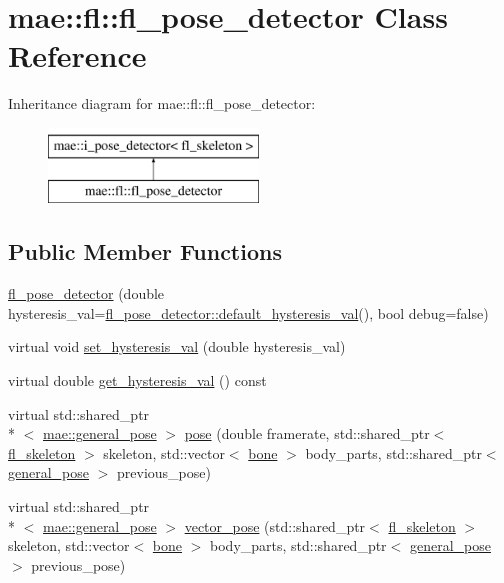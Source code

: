 \hypertarget{classmae_1_1fl_1_1fl__pose__detector}{\section{mae\-:\-:fl\-:\-:fl\-\_\-pose\-\_\-detector Class Reference}
\label{classmae_1_1fl_1_1fl__pose__detector}
}
Inheritance diagram for mae\-:\-:fl\-:\-:fl\-\_\-pose\-\_\-detector\-:\begin{figure}[H]
\begin{center}
\leavevmode
\includegraphics[height=2.000000cm]{classmae_1_1fl_1_1fl__pose__detector}
\end{center}
\end{figure}
\subsection*{Public Member Functions}
\begin{DoxyCompactItemize}
\item 
\hyperlink{classmae_1_1fl_1_1fl__pose__detector_a3e52ce649f55340ebcd5a2fec804278b}{fl\-\_\-pose\-\_\-detector} (double hysteresis\-\_\-val=\hyperlink{classmae_1_1fl_1_1fl__pose__detector_adb2f046d501a87de9e5589b346ef3782}{fl\-\_\-pose\-\_\-detector\-::default\-\_\-hysteresis\-\_\-val}(), bool debug=false)
\item 
virtual void \hyperlink{classmae_1_1fl_1_1fl__pose__detector_a807c41e01fed7a729058b91ff4ff90f3}{set\-\_\-hysteresis\-\_\-val} (double hysteresis\-\_\-val)
\item 
virtual double \hyperlink{classmae_1_1fl_1_1fl__pose__detector_a5347e97f3685d7168a182e7e373f09cf}{get\-\_\-hysteresis\-\_\-val} () const 
\item 
virtual std\-::shared\-\_\-ptr\\*
$<$ \hyperlink{classmae_1_1general__pose}{mae\-::general\-\_\-pose} $>$ \hyperlink{classmae_1_1fl_1_1fl__pose__detector_a3a0f6afa25ce9bc25154e93e671edd23}{pose} (double framerate, std\-::shared\-\_\-ptr$<$ \hyperlink{classmae_1_1fl_1_1fl__skeleton}{fl\-\_\-skeleton} $>$ skeleton, std\-::vector$<$ \hyperlink{classmae_1_1bone}{bone} $>$ body\-\_\-parts, std\-::shared\-\_\-ptr$<$ \hyperlink{classmae_1_1general__pose}{general\-\_\-pose} $>$ previous\-\_\-pose)
\item 
virtual std\-::shared\-\_\-ptr\\*
$<$ \hyperlink{classmae_1_1general__pose}{mae\-::general\-\_\-pose} $>$ \hyperlink{classmae_1_1fl_1_1fl__pose__detector_ae7f558696efe7f55cf4895bffd234665}{vector\-\_\-pose} (std\-::shared\-\_\-ptr$<$ \hyperlink{classmae_1_1fl_1_1fl__skeleton}{fl\-\_\-skeleton} $>$ skeleton, std\-::vector$<$ \hyperlink{classmae_1_1bone}{bone} $>$ body\-\_\-parts, std\-::shared\-\_\-ptr$<$ \hyperlink{classmae_1_1general__pose}{general\-\_\-pose} $>$ previous\-\_\-pose)
\end{DoxyCompactItemize}
